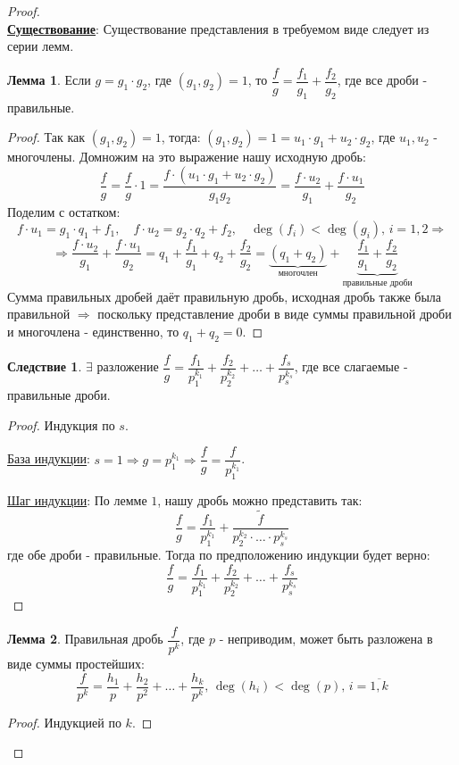\documentclass[12pt]{article}
\theoremstyle{definition}
\newtheorem{lemma}{Лемма}
\newtheorem{corollary}{Следствие}
\newcommand{\wte}[1]{\widetilde{#1}}
\newcommand{\ovl}[1]{\overline{#1}}
\begin{document}
\begin{proof}\hfill\\
	\textbf{\uline{Существование}}: Существование представления в требуемом виде следует из серии лемм.
	\begin{lemma}
		Если $g = g_1{\cdot}g_2$, где $(g_1,g_2) = 1$, то $\dfrac{f}{g} = \dfrac{f_1}{g_1} + \dfrac{f_2}{g_2}$, где все дроби - правильные.
	\end{lemma}
	\begin{proof}
		Так как $(g_1,g_2) = 1$, тогда: $(g_1,g_2) = 1 = u_1{\cdot}g_1 + u_2 {\cdot}g_2$, где $u_1,u_2$ - многочлены. Домножим на это выражение нашу исходную дробь:
		$$
			\dfrac{f}{g} = \dfrac{f}{g}{\cdot}1 = \dfrac{f{\cdot}(u_1{\cdot}g_1 + u_2 {\cdot}g_2)}{g_1g_2} = \dfrac{f{\cdot}u_2}{g_1} + \dfrac{f{\cdot}u_1}{g_2}
		$$
		Поделим с остатком:
		$$
			f{\cdot}u_1 = g_1{\cdot}q_1 + f_1, \quad f{\cdot}u_2 = g_2{\cdot}q_2 + f_2, \quad \deg(f_i) < \deg(g_i), \, i =1,2 \Rightarrow
		$$
		$$
			\Rightarrow \dfrac{f{\cdot}u_2}{g_1} + \dfrac{f{\cdot}u_1}{g_2} = q_1 + \dfrac{f_1}{g_1} + q_2 + \dfrac{f_2}{g_2} = \underbrace{(q_1 + q_2)}_{\text{многочлен}} + \underbrace{\dfrac{f_1}{g_1} + \dfrac{f_2}{g_2}}_{\text{правильные дроби}}
		$$
		Сумма правильных дробей даёт правильную дробь, исходная дробь также была правильной $\Rightarrow$ поскольку представление дроби в виде суммы правильной дроби и многочлена - единственно, то $q_1 + q_2 = 0$.
	\end{proof}
	\begin{corollary}
		$\exists$ разложение $\dfrac{f}{g} = \dfrac{f_1}{p_1^{k_1}} + \dfrac{f_2}{p_2^{k_2}} + \dotsc + \dfrac{f_s}{p_s^{k_s}}$, где все слагаемые - правильные дроби.
	\end{corollary}
	\begin{proof}
		Индукция по $s$.
		
		\uline{База индукции}: $s = 1 \Rightarrow g = p_1^{k_1} \Rightarrow \dfrac{f}{g} = \dfrac{f}{p_1^{k_1}}$.
		
		\uline{Шаг индукции}: По лемме $1$, нашу дробь можно представить так:
		$$
			\dfrac{f}{g} = \dfrac{f_1}{p_1^{k_1}} + \dfrac{\wte{f}}{p_2^{k_2}{\cdot}\dotsc{\cdot}p_s^{k_s}}
		$$
		где обе дроби - правильные. Тогда по предположению индукции будет верно:
		$$
			\dfrac{f}{g} = \dfrac{f_1}{p_1^{k_1}} + \dfrac{f_2}{p_2^{k_2}} + \dotsc + \dfrac{f_s}{p_s^{k_s}}
		$$
	\end{proof}
	\begin{lemma}
		Правильная дробь $\dfrac{f}{p^k}$, где $p$ - неприводим, может быть разложена в виде суммы простейших:
		$$
			\dfrac{f}{p^k} = \dfrac{h_1}{p} + \dfrac{h_2}{p^2} + \dotsc + \dfrac{h_k}{p^k}, \, \deg(h_i) < \deg(p), \, i = \ovl{1,k}
		$$
	\end{lemma}
	\begin{proof}
		Индукцией по $k$.
		

\end{proof}
\end{proof}
\end{document}

